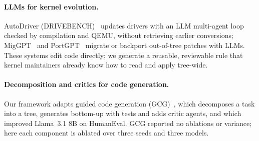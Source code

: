 \paragraph{LLMs for kernel evolution.} AutoDriver (DRIVEBENCH)~\cite{kharlamova2025autodriver} updates drivers with
an LLM multi-agent loop checked by compilation and QEMU, without retrieving earlier conversions; MigGPT~\cite{dang2025miggpt}
and PortGPT~\cite{li2026portgpt} migrate or backport out-of-tree patches with LLMs. These systems edit code directly; we
generate a reusable, reviewable rule that kernel maintainers already know how to read and apply tree-wide.

\paragraph{Decomposition and critics for code generation.} Our framework adapts guided code generation
(GCG)~\cite{almorsi2025gcg}, which decomposes a task into a tree, generates bottom-up with tests and adds critic
agents, and which improved Llama~3.1 8B on HumanEval. GCG reported no ablations or variance; here each component
is ablated over three seeds and three models.
